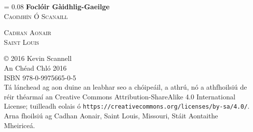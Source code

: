 \documentclass[8pt,twocolumn,openany]{extbook}
\newlength{\drop}
\newcommand*{\titleM}{\begingroup
\drop = 0.08\textheight
\centering
\vspace*{\drop}
{\Huge\bfseries Focl\'oir G\`aidhlig-Gaeilge}\\[\baselineskip]
{\large\scshape Caoimh\'{\i}n \'O Scanaill}\par
\vfill
{\large\scshape Cadhan Aonair}\\[\baselineskip]
{\large\scshape Saint Louis}\par
\vspace*{2\drop}
\endgroup}
\begin{document}
\begin{frontmatter}
\pagestyle{empty}
\onecolumn
\titleM
\clearpage



\newpage

{\centering
\copyright \hspace{0.5ex} 2016 Kevin Scannell\\[\baselineskip]
An Chéad Chló 2016\\[\baselineskip]
ISBN 978-0-9975665-0-5\\[\baselineskip]
}
\vfill
\noindent
Tá lánchead ag aon duine an leabhar seo a chóipeáil, a athrú, nó a athfhoilsiú
de réir théarmaí an Creative Commons Attribution-ShareAlike 4.0 International
License; tuilleadh eolais ó 
\texttt{https://creativecommons.org/licenses/by-sa/4.0/}.\\[\baselineskip]
\noindent
Arna fhoilsiú ag Cadhan Aonair, Saint Louis, Missouri, Stáit Aontaithe Mheiriceá.



\end{frontmatter}
\end{document}
